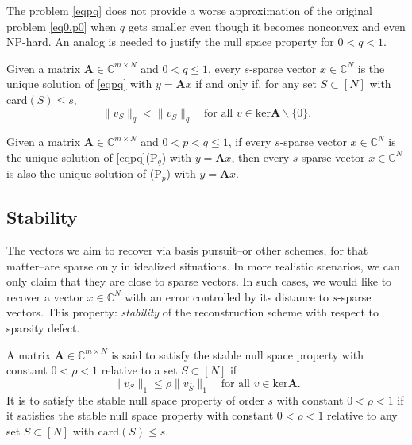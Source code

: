 The problem \cref{eqpq} does not provide a worse approximation of the original problem \cref{eq0.p0} when $q$ gets smaller even though it becomes nonconvex and even NP-hard. An analog is needed to justify the null space property for $0 < q < 1$.

\begin{theorem}
    \label{th0.4.9}
    Given a matrix $\mathbf{A} \in \mathbb{C}^{m \times N}$ and $0 <q \leq 1$, every $s$-sparse vector $x \in \mathbb{C}^N$ is the unique solution of \cref{eqpq} with $y = \mathbf{A}x$ if and only if, for any set $S\subset [N]$ with card$(S) \leq s$,
    \[
        \|v_S\|_q < \|v_{\bar{S}}\|_q \quad \text{for all }v \in \text{ker} \mathbf{A} \backslash \{0\}.
    \]
\end{theorem}

\begin{theorem}
    \label{th0.4.10}
    Given a matrix $\mathbf{A} \in \mathbb{C}^{m \times N}$ and $0 < p<q\leq1$, if every $s$-sparse vector $x \in \mathbb{C}^N$ is the unique solution of \cref{eqpq}(P$_q$) with $y = \mathbf{A}x$, then every $s$-sparse vector $x \in \mathbb{C}^N$ is also the unique solution of (P$_p$) with $y = \mathbf{A}x$.
\end{theorem}

\subsection{Stability}
The vectors we aim to recover via basis pursuit--or other schemes, for that matter--are sparse only in idealized situations. In more realistic scenarios, we can only claim that they are close to sparse vectors. In such cases, we would like to recover a vector $x \in \mathbb{C}^N$ with an error controlled by its distance to $s$-sparse vectors. This property: \emph{\textcolor[rgb]{1,0,0}{stability}} of the reconstruction scheme with respect to sparsity defect. 
\begin{definition}
    \label{def0.4.11}
    A matrix $\mathbf{A} \in \mathbb{C}^{m\times N}$ is said to satisfy the \textcolor[rgb]{1,0,0}{stable null space property} with constant $0 < \rho <1$ relative to a set $S \subset [N]$ if 
    \[
        \|v_S\|_1 \leq \rho\|v_{\bar{S}}\|_1 \quad \text{for all } v \in \text{ker}\mathbf{A}.
    \]
    It is to satisfy the stable null space property of order $s$ with constant $0< \rho <1$ if it satisfies the stable null space property with constant $0 <\rho < 1$ relative to any set $S \subset [N]$ with card$(S) \leq s$.
\end{definition}


